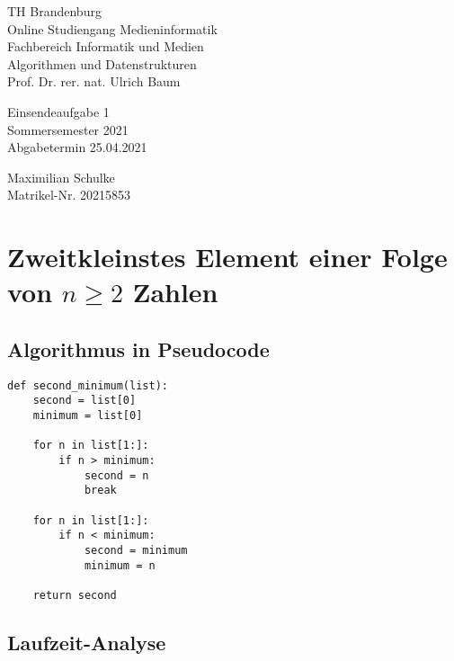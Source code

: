 \documentclass{article}
\begin{document}
\begin{titlepage}
	\begin{flushleft}
		TH Brandenburg \\
		Online Studiengang Medieninformatik \\
		Fachbereich Informatik und Medien \\
		Algorithmen und Datenstrukturen \\
		Prof. Dr. rer. nat. Ulrich Baum
	\end{flushleft}

	\vfill

	\begin{center}
		\Large{Einsendeaufgabe 1}\\[0.5em]
		\large{Sommersemester 2021}\\[0.25em]
		\large{Abgabetermin 25.04.2021}
	\end{center}

	\vfill

	\begin{flushright}
		Maximilian Schulke \\
		Matrikel-Nr. 20215853
	\end{flushright}
\end{titlepage}

\newpage

\section{Zweitkleinstes Element einer Folge  von $n \geq 2$ Zahlen}

\subsection{Algorithmus in Pseudocode}

\begin{lstlisting}
def second_minimum(list):
    second = list[0]
    minimum = list[0]

    for n in list[1:]:
        if n > minimum:
            second = n
            break

    for n in list[1:]:
        if n < minimum:
            second = minimum
            minimum = n

    return second
\end{lstlisting}

\subsection{Laufzeit-Analyse}
\end{document}
